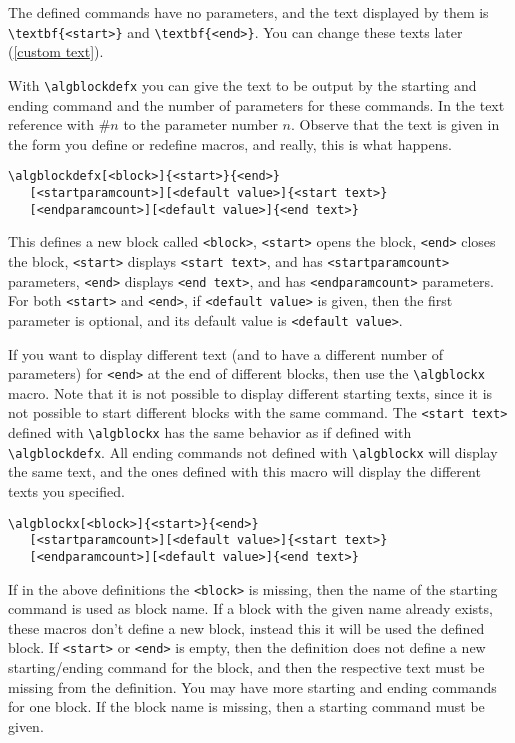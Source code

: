 \documentclass{article}
\begin{document}
\begin{minipage}[b]{0.5\linewidth}
\begin{minipage}[b]{0.5\linewidth}
\begin{minipage}[b]{0.5\linewidth}
\begin{minipage}[b]{0.5\linewidth}
\begin{minipage}[b]{0.5\linewidth}
\begin{minipage}[b]{0.5\linewidth}
\begin{minipage}[b]{0.5\linewidth}
The defined commands have no parameters, and the text displayed by them is
\verb:\textbf{<start>}: and \verb:\textbf{<end>}:. You can change these texts later
(\ref{custom text}). 

With \verb:\algblockdefx: you can give the text to be output by the starting
and ending command and the number of parameters for these commands. In the text
reference with \#$n$ to the parameter number $n$. Observe that the text
is given in the form you define or redefine macros, and really, this is what happens.

\begin{verbatim}
\algblockdefx[<block>]{<start>}{<end>}
   [<startparamcount>][<default value>]{<start text>}
   [<endparamcount>][<default value>]{<end text>}
\end{verbatim}

This defines a new block called \verb:<block>:, \verb:<start>: opens the block, 
\verb:<end>: closes the block,
\verb:<start>: displays \verb:<start text>:, and has \verb:<startparamcount>: parameters,
\verb:<end>: displays \verb:<end text>:, and has \verb:<endparamcount>: parameters. 
For both \verb:<start>: and \verb:<end>:, if
\verb:<default value>: is given, then the first parameter is optional, and its default value
is \verb:<default value>:.

If you want to display different text (and to have a different number of parameters)
for \verb:<end>: at the end of different blocks, then use
the \verb:\algblockx: macro. Note that it is not possible to display different starting texts,
since it is not possible to start different blocks with the same command. The \verb:<start text>:
defined with \verb:\algblockx: has the same behavior as if defined with \verb:\algblockdefx:. All ending commands
not defined with \verb:\algblockx: will display the same text, and the ones defined with this
macro will display the different texts you specified.

\begin{verbatim}
\algblockx[<block>]{<start>}{<end>}
   [<startparamcount>][<default value>]{<start text>}
   [<endparamcount>][<default value>]{<end text>}
\end{verbatim}

If in the above definitions the \verb:<block>: is missing, then the name of the starting command
is used as block name. If a block with the given name
already exists, these macros don't define a new block, instead this it will be used the defined 
block. If \verb:<start>: or \verb:<end>: is empty, then
the definition does not define a new starting/ending command for the block, and then the
respective text must be missing from the definition. You may have more starting and ending commands
for one block. If the block name is missing, then a starting command must be given.



\end{minipage}
\end{minipage}
\end{minipage}
\end{minipage}
\end{minipage}
\end{minipage}
\end{minipage}
\end{document}
